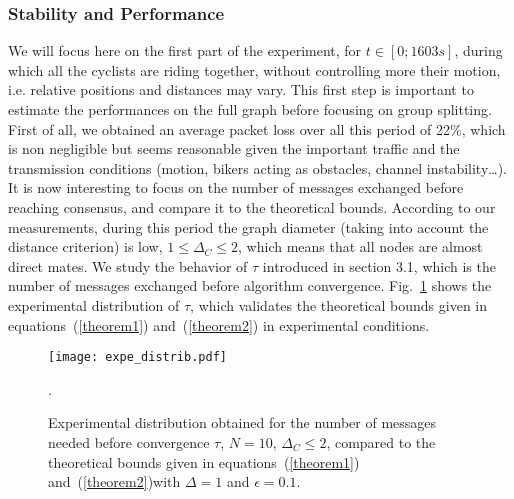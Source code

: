 \documentclass{sig-alternate}
\begin{document}
\subsubsection{Stability and Performance}
We will focus here on the first part of the experiment, for $t\in [0;1603s]$, during which all the cyclists are riding together, without controlling more their motion, i.e. relative positions and distances may vary. This first step is important to estimate the performances on the full graph before focusing on group splitting.
First of all, we obtained an average packet loss over all this period of 22\%, which is non negligible but seems reasonable given the important traffic and the transmission conditions (motion, bikers acting as obstacles, channel instability\ldots).
It is now interesting to focus on the number of messages exchanged before reaching consensus, and compare it to the theoretical bounds. According to our measurements, during this period the graph diameter (taking into account the distance criterion) is low, $1\leq \Delta_C\leq 2$, which means that all nodes are almost direct mates.
We study the behavior of $\tau$ introduced in section 3.1, which is the number of messages exchanged before algorithm convergence.
Fig.~\ref{fig:expe_distrib} shows the  experimental distribution of $\tau$, which validates the theoretical bounds given in equations~(\ref{theorem1}) and~(\ref{theorem2}) in experimental conditions.




\begin{figure}[t]
\centering
\texttt{[image: expe\_distrib.pdf]}
\caption{Experimental distribution obtained for the number of messages needed before convergence $\tau$, $N=10$, $\Delta_C\leq 2$, compared to the theoretical bounds given in equations~(\ref{theorem1}) and~(\ref{theorem2})with $\Delta=1$ and $\epsilon=0.1$.}.
\label{fig:expe_distrib}
\end{figure}
\end{document}
